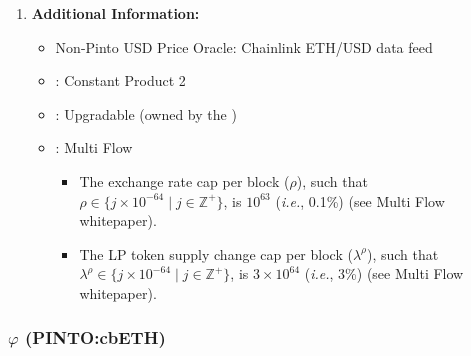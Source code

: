 \documentclass[class=article, crop=false]{standalone}
\begin{document}
\begin{enumerate}
    \item \textbf{Additional Information:}
        \begin{itemize}
            \item Non-Pinto USD Price Oracle: Chainlink ETH/USD data feed
            \item {}: Constant Product 2
            \item {}: Upgradable  (owned by the )
            \item {}: Multi Flow
                \begin{itemize}
                    \item The exchange rate cap per block ($\rho$), such that $\rho \in \{j \times 10^{-64} \mid j \in \mathbb{Z}^{+} \}$, is $10^{63}$ (\textit{i.e.}, 0.1\%) (see Multi Flow whitepaper).
                    \item The LP token supply change cap per block ($\lambda^{\rho}$), such that $\lambda^{\rho} \in \{j \times 10^{-64} \mid j \in \mathbb{Z}^{+} \}$, is $3 \times 10^{64}$ (\textit{i.e.}, 3\%) (see Multi Flow whitepaper).
                \end{itemize}
        \end{itemize}

\end{enumerate}


\subsubsection{$\varphi$ (PINTO:cbETH)}
\end{document}
